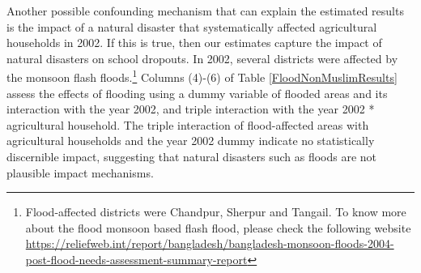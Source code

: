 \documentclass[12pt,letterpaper]{article}
\newcommand{\0}{\ensuremath{\mbox{\boldmath $0$}}}
\begin{document}
Another possible confounding mechanism that can explain the estimated results is the impact of a natural disaster that systematically affected agricultural households in 2002. If this is true, then our estimates capture the impact of natural disasters on school dropouts. In 2002, several districts were affected by the monsoon flash floods.\footnote{Flood-affected districts were Chandpur, Sherpur and Tangail. To know more about the flood monsoon based flash flood, please check the following website \url{https://reliefweb.int/report/bangladesh/bangladesh-monsoon-floods-2004-post-flood-needs-assessment-summary-report} } Columns (4)-(6) of Table \ref{FloodNonMuslimResults} assess the effects of flooding using a dummy variable of flooded areas and its interaction with the year 2002, and triple interaction with the year 2002 * agricultural household. The triple interaction of flood-affected areas with agricultural households and the year 2002 dummy indicate no statistically discernible impact, suggesting that natural disasters such as floods are not plausible impact mechanisms.






\end{document}
